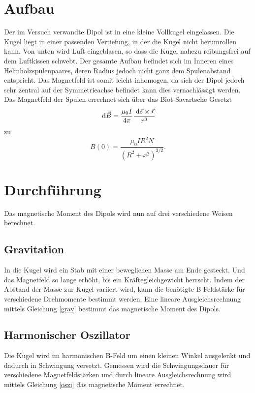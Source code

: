 \section{Aufbau}
Der im Versuch verwandte Dipol ist in eine kleine Vollkugel eingelassen. Die Kugel liegt in einer passenden Vertiefung, in der die Kugel nicht herumrollen kann. Von unten wird Luft eingeblasen, so dass die Kugel nahezu reibungsfrei auf dem Luftkissen schwebt.
Der gesamte Aufbau befindet sich im Inneren eines Helmholzspulenpaares, deren Radius jedoch nicht ganz dem Spulenabstand entspricht. Das Magnetfeld ist somit leicht inhomogen, da sich der Dipol jedoch sehr zentral auf der Symmetrieachse befindet kann dies vernachlässigt werden.
Das Magnetfeld der Spulen errechnet sich über das Biot-Savartsche Gesetzt
\begin{equation}
\; \mathrm{d} \vec{B} = \frac{\mu_0 I}{4\pi} \frac{\; \mathrm{d} \vec{s} \times \vec{r}}{r^3}
\end{equation} 
zu
\begin{equation}
B(0)=\frac{\mu_0 IR^2N}{(R^2+x^2)^{3/2}}.
\label{eqhelm}
\end{equation}

\section{Durchführung}
Das magnetische Moment des Dipols wird nun auf drei verschiedene Weisen berechnet.

\subsection{Gravitation}
In die Kugel wird ein Stab mit einer beweglichen Masse am Ende gesteckt. Und das Magnetfeld so lange erhöht, bis ein Kräftegleichgewicht herrscht. Indem der Abstand der Masse zur Kugel variiert wird, kann die benötigte B-Feldstärke für verschiedene Drehmomente bestimmt werden. Eine lineare Ausgleichsrechnung mittels Gleichung \eqref{grav} bestimmt das magnetische Moment des Dipols.
\subsection{Harmonischer Oszillator}
Die Kugel wird im harmonischen B-Feld um einen kleinen Winkel ausgelenkt und dadurch in Schwingung versetzt.
Gemessen wird die Schwingungsdauer für verschiedene Magnetfeldstärken und durch lineare Ausgleichsrechnung wird mittels Gleichung \eqref{oszi} das magnetische Moment errechnet.
